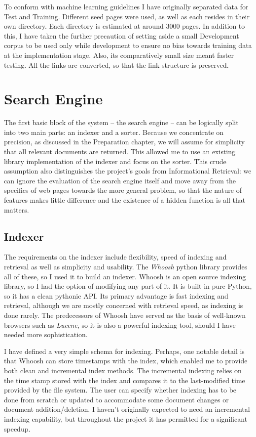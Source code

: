 \documentclass[12pt,notitlepage,twoside]{scrreprt}
\begin{document}
To conform with machine learning guidelines I have originally separated data
for Test and Training. Different seed pages were used, as well as each resides
in their own directory. Each directory is estimated at around 3000 pages. In
addition to this, I have taken the further precaution of setting aside a small
Development corpus to be used only while development to ensure no bias towards
training data at the implementation stage. Also, its comparatively small size
meant faster testing. All the links are converted, so that the link structure
is preserved.

\section{Search Engine}

The first basic block of the system -- the search engine -- can be logically
split into two main parts: an indexer and a sorter. Because we concentrate on
precision, as discussed in the Preparation chapter, we will assume for
simplicity that all relevant documents are returned. This allowed me to use an 
existing library implementation of the indexer and focus on the sorter.
This crude assumption also distinguishes the project's goals from Informational
Retrieval: we can ignore the evaluation of the search engine itself and move
away from the specifics of web pages towards the more general problem, so that
the nature of features makes little difference and the existence of a hidden
function is all that matters.

\subsection*{Indexer}

The requirements on the indexer include flexibility, speed of indexing and
retrieval as well as simplicity and usability.  The \textit{Whoosh} python
library provides all of these, so I used it to build an indexer. Whoosh is an
open source indexing library, so I had the option of modifying any part of it.
It is  built in pure Python, so it has a clean pythonic API. Its primary
advantage is fast indexing and retrieval, although we are mostly concerned with
retrieval speed, as indexing is done rarely. The predecessors of Whoosh have
served as the basis of well-known browsers such as \textit{Lucene}, so it is
also a powerful indexing tool, should I have needed more sophistication.

I have defined a very simple schema for indexing. Perhaps, one notable detail
is that Whoosh can store timestamps with the index, which enabled me to provide
both clean and incremental index methods. The incremental indexing relies on
the time stamp stored with the index and compares it to the last-modified time
provided by the file system. The user can specify whether indexing has to be
done from scratch or updated to accommodate some document changes or document
addition/deletion. I haven't originally expected to need an incremental
indexing capability, but throughout the project it has permitted for a
significant speedup.
\end{document}

